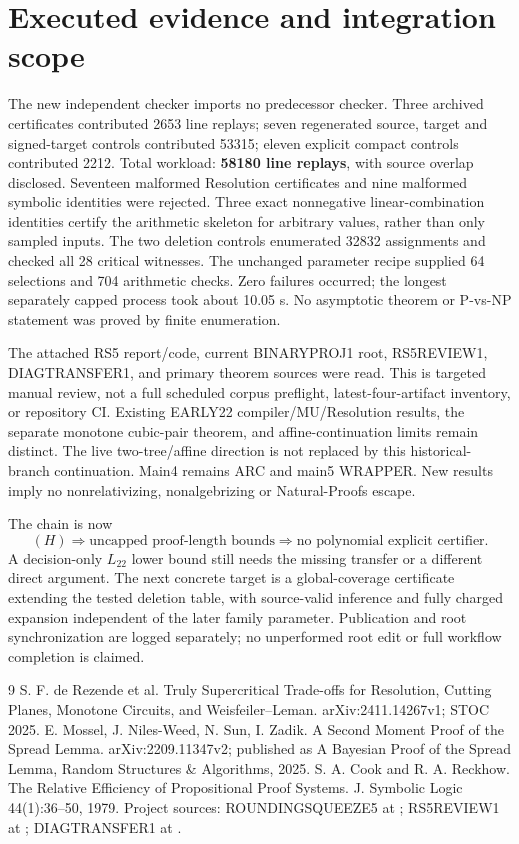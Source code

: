 \documentclass[11pt]{article}
\begin{document}
\section{Executed evidence and integration scope}
The new independent checker imports no predecessor checker. Three archived
certificates contributed 2653 line replays; seven regenerated source,
target and signed-target controls contributed 53315; eleven explicit compact
controls contributed 2212. Total workload: \textbf{58180 line replays}, with
source overlap disclosed. Seventeen malformed Resolution certificates and
nine malformed symbolic identities were rejected. Three exact nonnegative
linear-combination identities certify the arithmetic skeleton for arbitrary
values, rather than only sampled inputs. The two deletion controls enumerated
32832 assignments and checked all 28 critical witnesses. The unchanged
parameter recipe supplied 64 selections and 704 arithmetic checks. Zero
failures occurred; the longest separately capped process took about 10.05 s.
No asymptotic theorem or P-vs-NP statement was proved by finite enumeration.

The attached RS5 report/code, current BINARYPROJ1 root, RS5REVIEW1,
DIAGTRANSFER1, and primary theorem sources were read. This is targeted manual
review, not a full scheduled corpus preflight, latest-four-artifact inventory,
or repository CI. Existing EARLY22 compiler/MU/Resolution results, the separate
monotone cubic-pair theorem, and affine-continuation limits remain distinct.
The live two-tree/affine direction is not replaced by this historical-branch
continuation. Main4 remains ARC and main5 WRAPPER. New results imply no
nonrelativizing, nonalgebrizing or Natural-Proofs escape.

The chain is now
\[
 (H)\Longrightarrow\text{uncapped proof-length bounds}
 \Longrightarrow\text{no polynomial explicit certifier}.
\]
A decision-only $L_{22}$ lower bound still needs the missing transfer or a
different direct argument. The next concrete target is a global-coverage
certificate extending the tested deletion table, with source-valid inference
and fully charged expansion independent of the later family parameter.
Publication and root synchronization are logged separately; no unperformed
root edit or full workflow completion is claimed.

\begin{thebibliography}{9}\small
{} S. F. de Rezende et al. Truly Supercritical Trade-offs for
Resolution, Cutting Planes, Monotone Circuits, and Weisfeiler--Leman.
arXiv:2411.14267v1; STOC 2025.
 E. Mossel, J. Niles-Weed, N. Sun, I. Zadik. A Second Moment
Proof of the Spread Lemma. arXiv:2209.11347v2; published as A Bayesian Proof
of the Spread Lemma, Random Structures \& Algorithms, 2025.
 S. A. Cook and R. A. Reckhow. The Relative Efficiency of
Propositional Proof Systems. J. Symbolic Logic 44(1):36--50, 1979.
 Project sources: ROUNDINGSQUEEZE5 at
;
RS5REVIEW1 at ;
DIAGTRANSFER1 at .
\end{thebibliography}
\end{document}
